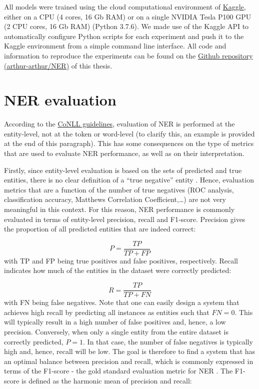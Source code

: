 \documentclass[12pt,a4paper,]{book}
\begin{document}
All models were trained using the cloud computational environment of \href{https://www.kaggle.com}{Kaggle}, either on a CPU (4 cores, 16 Gb RAM) or on a single NVIDIA Tesla P100 GPU (2 CPU cores, 16 Gb RAM) (Python 3.7.6). We made use of the Kaggle API to automatically configure Python scripts for each experiment and push it to the Kaggle environment from a simple command line interface. All code and information to reproduce the experiments can be found on the \href{https://github.com/arthur-arthur/NER}{Github repository (arthur-arthur/NER)} of this thesis.

\hypertarget{ner-evaluation}{%
\section{NER evaluation}\label{ner-evaluation}}

According to the \href{https://www.clips.uantwerpen.be/conll2000/chunking/output.html}{CoNLL guidelines}, evaluation of NER is performed at the entity-level, not at the token or word-level (to clarify this, an example is provided at the end of this paragraph). This has some consequences on the type of metrics that are used to evaluate NER performance, as well as on their interpretation.

Firstly, since entity-level evaluation is based on the sets of predicted and true entities, there is no clear definition of a ``true negative'' entity \citep{esuli2010}. Hence, evaluation metrics that are a function of the number of true negatives (ROC analysis, classification accuracy, Matthews Correlation Coefficient,\ldots{}) are not very meaningful in this context. For this reason, NER performance is commonly evaluated in terms of entity-level precision, recall and F1-score. Precision gives the proportion of all predicted entities that are indeed correct:

\[
P = \frac{TP}{TP + FP}
\]
with TP and FP being true positives and false positives, respectively. Recall indicates how much of the entities in the dataset were correctly predicted:

\[
R = \frac{TP}{TP + FN}
\]
with FN being false negatives. Note that one can easily design a system that achieves high recall by predicting all instances as entities such that \(FN=0\). This will typically result in a high number of false positives and, hence, a low precision. Conversely, when only a single entity from the entire dataset is correctly predicted, \(P=1\). In that case, the number of false negatives is typically high and, hence, recall will be low. The goal is therefore to find a system that has an optimal balance between precision and recall, which is commonly expressed in terms of the F1-score - the gold standard evaluation metric for NER \citep{tjongkimsang2003}. The F1-score is defined as the harmonic mean of precision and recall:
\end{document}
